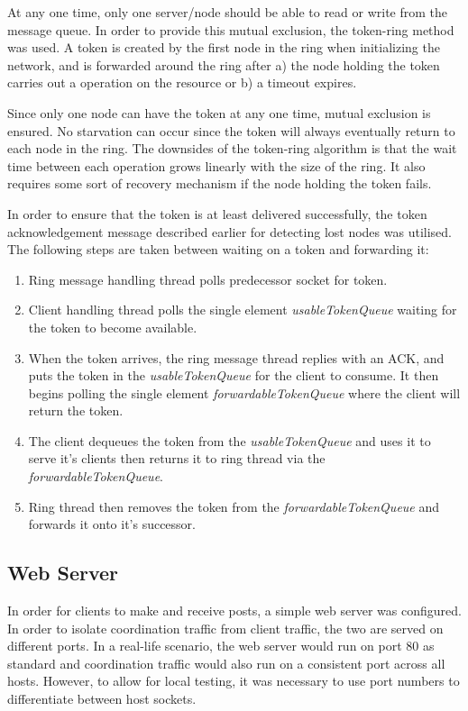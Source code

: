 \documentclass[12pt]{article}
\begin{document}
At any one time, only one server/node should be able to read or write from the message queue. In order to provide this mutual exclusion, the token-ring method was used. A token is created by the first node in the ring when initializing the network, and is forwarded around the ring after a) the node holding the token carries out a operation on the resource or b) a timeout expires. 

Since only one node can have the token at any one time, mutual exclusion is ensured. No starvation can occur since the token will always eventually return to each node in the ring. The downsides of the token-ring algorithm is that the wait time between each operation grows linearly with the size of the ring. It also requires some sort of recovery mechanism if the node holding the token fails.

In order to ensure that the token is at least delivered successfully, the token acknowledgement message described earlier for detecting lost nodes was utilised. The following steps are taken between waiting on a token and forwarding it:

\begin{enumerate}
	\item Ring message handling thread polls predecessor socket for token.
	\item Client handling thread polls the single element \emph{usableTokenQueue} waiting for the token to become available.
	\item When the token arrives, the ring message thread replies with an ACK, and puts the token in the \emph{usableTokenQueue} for the client to consume. It then begins polling the single element \emph{forwardableTokenQueue} where the client will return the token.
	\item The client dequeues the token from the \emph{usableTokenQueue} and uses it to serve it's clients then returns it to ring thread via the \emph{forwardableTokenQueue}.
	\item Ring thread then removes the token from the \emph{forwardableTokenQueue} and forwards it onto it's successor.
\end{enumerate}

\subsection{Web Server}

In order for clients to make and receive posts, a simple web server was configured. In order to isolate coordination traffic from client traffic, the two are served on different ports. In a real-life scenario, the web server would run on port 80 as standard and coordination traffic would also run on a consistent port across all hosts. However, to allow for local testing, it was necessary to use port numbers to differentiate between host sockets. 
\end{document}
